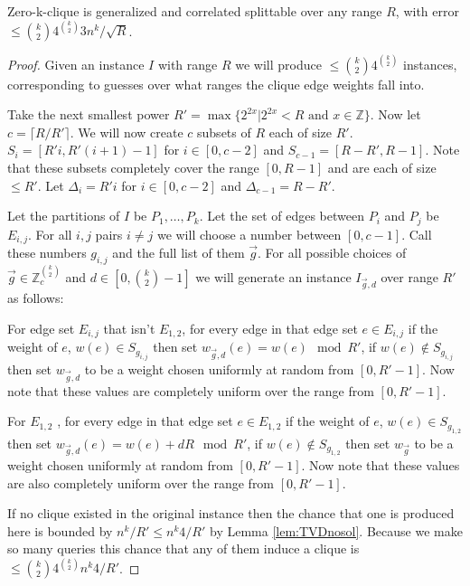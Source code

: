 \begin{theorem}
	Zero-k-clique is generalized and correlated splittable over any range $R$, with error $\leq \binom{k}{2}4^{\binom{k}{2}}3 n^k/\sqrt{R}$. 
	\label{thm:zkcsplittable}
\end{theorem}
\begin{proof}
	Given an instance $I$ with range $R$ we will produce $\leq \binom{k}{2}4^{\binom{k}{2}}$ instances, corresponding to guesses over what ranges the clique edge weights fall into. 
	
	Take the next smallest power $R' = \max\{2^{2x}| 2^{2x}<R \text{ and } x\in \mathbb{Z} \} $. 
	Now let $c = \lceil R/R' \rceil$. We will now create $c$ subsets of $R$ each of size $R'$.  $S_i = [R'i,R'(i+1)-1]$ for $i\in [0,c-2]$ and $S_{c-1} = [R-R' , R-1]$. Note that these subsets completely cover the range $[0, R-1]$ and are each of size $\le R'$. Let $\Delta_i = R'i$ for $i\in [0,c-2]$ and $\Delta_{c-1} = R-R'$. 
	
	Let the partitions of $I$ be $P_1, \ldots, P_k$. Let the set of edges between $P_i$ and $P_j$ be $E_{i,j}$. For all $i,j$ pairs $i\ne j$ we will choose a number between $[0,c-1]$. Call these numbers $g_{i,j}$ and the full list of them $\vec{g}$. For all possible choices of $\vec{g} \in \mathbb{Z}_{c}^{\binom{k}{2}}$ and $d \in [0, \binom{k}{2}-1]$ we will generate an instance $I_{\vec{g},d}$ over range $R'$ as follows: 
	
	For edge set $E_{i,j}$ that isn't $E_{1,2}$, for every edge in that edge set $e \in E_{i,j}$ if the weight of $e$, $w(e) \in S_{g_{i,j}}$ then set $w_{\vec{g},d}(e) = w(e) \mod R'$, if $w(e) \nin S_{g_{i,j}}$ then set $w_{\vec{g},d}$ to be a weight chosen uniformly at random from $[0, R'-1]$. Now note that these values are completely uniform over the range from $[0,R'-1]$. 
	
	For $E_{1,2}$ , for every edge in that edge set $e \in E_{1,2}$ if the weight of $e$, $w(e) \in S_{g_{1,2}}$ then set $w_{\vec{g},d}(e) = w(e) + dR \mod R'$, if $w(e) \nin S_{g_{1,2}}$ then set $w_{\vec{g}}$ to be a weight chosen uniformly at random from $[0, R'-1]$. Now note that these values are also completely uniform over the range from $[0,R'-1]$. 
	
	If no clique existed in the original instance then the chance that one is produced here is bounded by $n^k/R' \leq n^k4/R'$ by Lemma \ref{lem:TVDnosol}. Because we make so many queries this chance that any of them induce a clique is $\leq \binom{k}{2}4^{\binom{k}{2}}n^k4/R'$. 
	

\end{proof}
